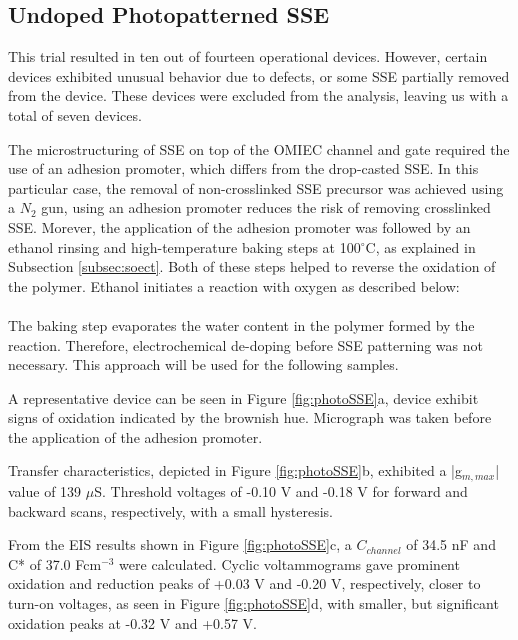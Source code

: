 \subsection{Undoped Photopatterned SSE} %
This trial resulted in ten out of fourteen operational devices. %
However, certain devices exhibited unusual behavior due to defects, or some SSE partially removed from the device. These devices were excluded from the analysis, leaving us with a total of seven devices.

The microstructuring of SSE on top of the OMIEC channel and gate required the use of an adhesion promoter, which differs from the drop-casted SSE. In this particular case, the removal of non-crosslinked SSE precursor was achieved using a $N_{2}$ gun, using an adhesion promoter reduces the risk of removing crosslinked SSE. %
Morever, the application of the adhesion promoter was followed by an ethanol rinsing and high-temperature baking steps at 100$^{\circ}$C, as explained in Subsection \ref{subsec:soect}. Both of these steps helped to reverse the oxidation of the polymer. Ethanol initiates a reaction with oxygen as described below: \\

\hspace{2.5cm}  \\ 

The baking step evaporates the water content in the polymer formed by the reaction. Therefore, electrochemical de-doping before SSE patterning was not necessary. This approach will be used for the following samples.

A representative device can be seen in Figure \ref{fig:photoSSE}a, device exhibit signs of oxidation indicated by the brownish hue. Micrograph was taken before the application of the adhesion promoter. 

Transfer characteristics, depicted in Figure \ref{fig:photoSSE}b, exhibited a |g$_{m,max}$| value of 139 $\mu$S. Threshold voltages of -0.10 V and -0.18 V for forward and backward scans, respectively, with a small hysteresis. 

From the EIS results shown in Figure \ref{fig:photoSSE}c, a $C_{channel}$ of 34.5 nF and C* of 37.0 Fcm$^{-3}$ were calculated. Cyclic voltammograms gave prominent oxidation and reduction peaks of +0.03 V and -0.20 V, respectively, closer to turn-on voltages, as seen in Figure \ref{fig:photoSSE}d, with smaller, but significant oxidation peaks at -0.32 V and +0.57 V.

